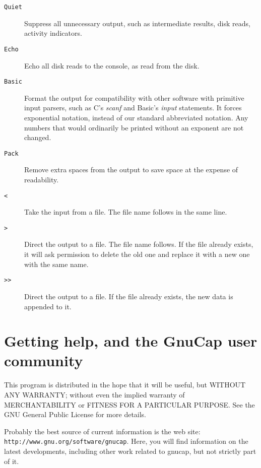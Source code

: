 \begin{description}

\item[{\tt Quiet}] Suppress all unnecessary output, such as intermediate
results, disk reads, activity indicators.

\item[{\tt Echo}] Echo all disk reads to the console, as read from the disk.

\item[{\tt Basic}] Format the output for compatibility with other software
with primitive input parsers, such as C's {\em scanf} and Basic's {\em input}
statements.  It forces exponential notation, instead of our standard
abbreviated notation.  Any numbers that would ordinarily be printed without
an exponent are not changed.

\item[{\tt Pack}] Remove extra spaces from the output to save space at the 
expense of readability.

\item[{\tt <}] Take the input from a file.  The file name follows in the
same line.

\item[{\tt >}] Direct the output to a file.  The file name follows.  If the
file already exists, it will ask permission to delete the old one and
replace it with a new one with the same name.

\item[{\tt >>}] Direct the output to a file.  If the file already exists,
the new data is appended to it.  

\end{description}
\section{Getting help, and the GnuCap user community}

This program is distributed in the hope that it will be useful, but WITHOUT
ANY WARRANTY; without even the implied warranty of MERCHANTABILITY or
FITNESS FOR A PARTICULAR PURPOSE.  See the GNU General Public License for
more details.

Probably the best source of current information is the web site: {\tt
http://www.gnu.org/software/gnucap}.  Here, you will find information
on the latest developments, including other work related to gnucap,
but not strictly part of it.

